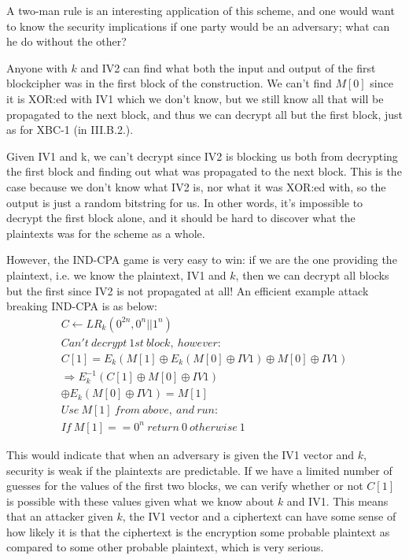 \documentclass[conference]{IEEEtran}
\begin{document}
A two-man rule is an interesting application of this scheme, and one would want to know the security implications if one party would be an adversary; what can he do without the other? \

Anyone with $k$ and IV2 can find what both the input and output of the first blockcipher was in the first block of the construction. We can't find $M[0]$ since it is XOR:ed with IV1 which we don't know, but we still know all that will be propagated to the next block, and thus we can decrypt all but the first block, just as for XBC-1 (in III.B.2.). \

Given IV1 and k, we can't decrypt since IV2 is blocking us both from decrypting the first block and finding out what was propagated to the next block. This is the case because we don't know what IV2 is, nor what it was XOR:ed with, so the output is just a random bitstring for us. In other words, it's impossible to decrypt the first block alone, and it should be hard to discover what the plaintexts was for the scheme as a whole. \

However, the IND-CPA game is very easy to win: if we are the one providing the plaintext, i.e. we know the plaintext, IV1 and $k$, then we can decrypt all blocks but the first since IV2 is not propagated at all! An efficient example attack breaking IND-CPA is as below:
\begin{gather*}
  C \leftarrow LR_k(0^{2n},0^n || 1^n) \\
  Can't\ decrypt\ 1st\ block,\ however: \\
  C[1] = E_k(M[1] \oplus E_k(M[0] \oplus IV1) \oplus M[0] \oplus IV1) \\
  \Rightarrow E_k^{-1}(C[1] \oplus M[0] \oplus IV1) \\
  \oplus E_k(M[0] \oplus IV1) = M[1] \\
  Use\ M[1]\ from\ above,\ and\ run: \\
  If\ M[1]==0^n\ return\ 0\ otherwise\ 1
\end{gather*}

This would indicate that when an adversary is given the IV1 vector and $k$, security is weak if the plaintexts are predictable. If we have a limited number of guesses for the values of the first two blocks, we can verify whether or not $C[1]$ is possible with these values given what we know about $k$ and IV1. This means that an attacker given $k$, the IV1 vector and a ciphertext can have some sense of how likely it is that the ciphertext is the encryption some probable plaintext as compared to some other probable plaintext, which is very serious.
\end{document}
